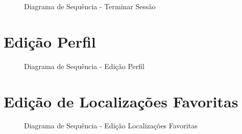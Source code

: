 \documentclass[a4paper,12pt]{scrreprt}
\begin{document}
\begin{figure}[hbt!]
    \centering
    \caption{Diagrama de Sequência - Terminar Sessão}
\end{figure}

\section{Edição Perfil}

\begin{figure}[hbt!]
    \centering
    \caption{Diagrama de Sequência - Edição Perfil}
\end{figure}

\clearpage

\section{Edição de Localizações Favoritas}

\begin{figure}[hbt!]
    \centering
    \caption{Diagrama de Sequência - Edição Localizações Favoritas}
\end{figure}
\end{document}

